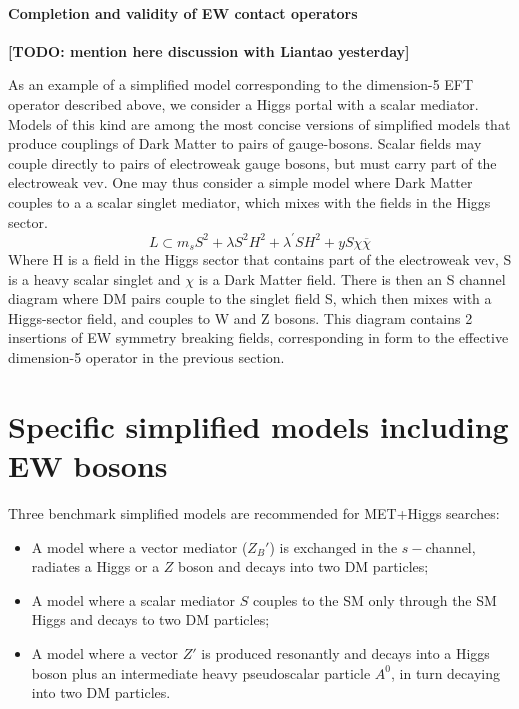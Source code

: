 \paragraph{Completion and validity of EW contact operators}

\textbf{[TODO: mention here discussion with Liantao yesterday]}


As an example of a simplified model corresponding to the dimension-5 EFT operator 
described above, we consider a Higgs portal with a scalar mediator. Models of this kind
are among the most concise versions of simplified models that produce 
couplings of Dark Matter to pairs of gauge-bosons.  Scalar fields may couple directly to pairs of electroweak gauge bosons, 
but must carry part of the electroweak vev.  One may thus consider a simple model where Dark Matter couples to a a scalar 
singlet mediator, which mixes with the fields in the Higgs sector.
\begin{equation}
L\subset m_s S^2 + \lambda S^2H^2 +\lambda^{'} S H^2 + y S \chi \overline{\chi}
\end{equation}
Where H is a field in the Higgs sector that contains part of the electroweak vev, 
S is a heavy scalar singlet and $\chi$ is a Dark Matter field. 
There is then an S channel diagram where DM pairs couple to the singlet field S, 
which then mixes with a Higgs-sector field, and couples to W and Z bosons. 
This diagram contains 2 insertions of EW symmetry breaking fields, 
corresponding in form to the effective dimension-5 operator in the previous section.   

\section{Specific simplified models including EW bosons}

Three benchmark simplified models \cite{Carpenter:2013xra,Berlin:2014cfa} 
are recommended for MET+Higgs searches:
\begin{itemize}
	\item A model where a vector mediator ($Z_B'$) is exchanged in the $s-$channel, 
	radiates a Higgs or a $Z$ boson and decays into two DM particles;
	\item A model where a scalar mediator $S$ couples to the SM only 
	through the SM Higgs and decays to two DM particles;
	\item A model where a vector $Z'$ is produced resonantly and decays into a Higgs boson
	plus an intermediate heavy pseudoscalar particle $A^0$, in turn decaying into two DM particles. 
\end{itemize}

